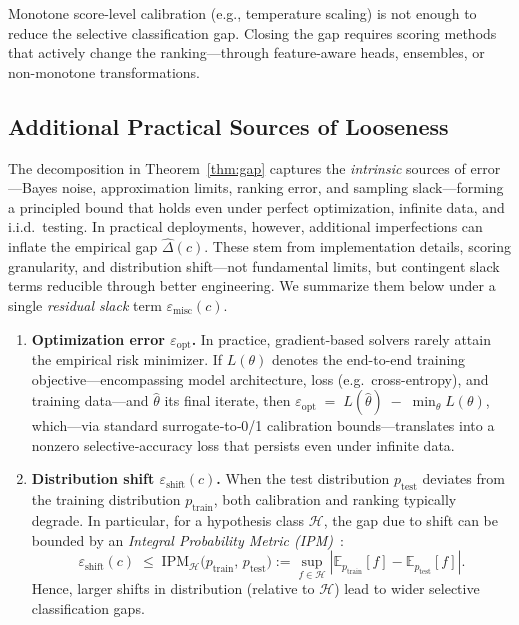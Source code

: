 \begin{takeaway}
Monotone score-level calibration (e.g., temperature scaling) is not enough to reduce the selective classification gap. Closing the gap requires scoring methods that actively change the ranking—through feature-aware heads, ensembles, or non-monotone transformations.
\end{takeaway}


\subsection{Additional Practical Sources of Looseness}
\label{sec:extra-slack-short}
The decomposition in Theorem~\ref{thm:gap} captures the \emph{intrinsic} sources of error—Bayes noise, approximation limits, ranking error, and sampling slack—forming a principled bound that holds even under perfect optimization, infinite data, and i.i.d.\ testing. In practical deployments, however, additional imperfections can inflate the empirical gap \(\widehat{\Delta}(c)\). These stem from implementation details, scoring granularity, and distribution shift—not fundamental limits, but contingent slack terms reducible through better engineering. We summarize them below under a single \emph{residual slack} term \(\varepsilon_{\text{misc}}(c)\).
\begin{enumerate}
  \item \textbf{Optimization error \(\varepsilon_{\text{opt}}\).}  
    In practice, gradient‐based solvers rarely attain the empirical risk minimizer. If \(L(\theta)\) denotes the end-to-end training objective—encompassing model architecture, loss (e.g.\ cross-entropy), and training data—and \(\hat\theta\) its final iterate, then $\varepsilon_{\text{opt}}\;=\; L(\hat\theta) \;-\; \min_{\theta}L(\theta)$, which—via standard surrogate‐to‐0/1 calibration bounds—translates into a nonzero selective‐accuracy loss that persists even under infinite data.
  \item \textbf{Distribution shift \(\varepsilon_{\text{shift}}(c)\).}  
  When the test distribution \(p_{\mathrm{test}}\) deviates from the training distribution \(p_{\mathrm{train}}\), both calibration and ranking typically degrade. In particular, for a hypothesis class \(\mathcal{H}\), the gap due to shift can be bounded by an \emph{Integral Probability Metric (IPM)}~\citep{muller1997integral}:
  \begin{equation}
    \varepsilon_{\text{shift}}(c)\;\le\;\mathrm{IPM}_{\mathcal{H}}\bigl(p_{\mathrm{train}},\,p_{\mathrm{test}}\bigr)
    := \sup_{f \in \mathcal{H}} \left| \mathbb{E}_{p_{\mathrm{train}}}[f] - \mathbb{E}_{p_{\mathrm{test}}}[f] \right|.
  \end{equation}
  Hence, larger shifts in distribution (relative to \(\mathcal{H}\)) lead to wider selective classification gaps.
\end{enumerate}
